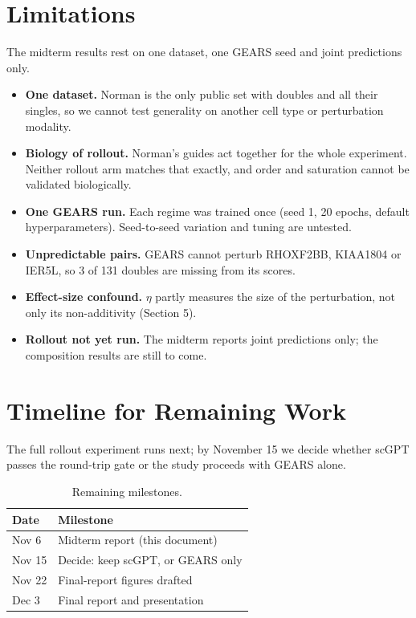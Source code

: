 \documentclass[11pt]{article}
\begin{document}
\section{Limitations}

The midterm results rest on one dataset, one GEARS seed and joint predictions only.
\begin{itemize}
  \item \textbf{One dataset.} Norman is the only public set with doubles and all their
  singles, so we cannot test generality on another cell type or perturbation modality.
  \item \textbf{Biology of rollout.} Norman's guides act together for the whole experiment.
  Neither rollout arm matches that exactly, and order and saturation cannot be validated
  biologically.
  \item \textbf{One GEARS run.} Each regime was trained once (seed 1, 20 epochs, default
  hyperparameters). Seed-to-seed variation and tuning are untested.
  \item \textbf{Unpredictable pairs.} GEARS cannot perturb RHOXF2BB, KIAA1804 or IER5L, so 3
  of 131 doubles are missing from its scores.
  \item \textbf{Effect-size confound.} $\eta$ partly measures the size of the perturbation,
  not only its non-additivity (Section 5).
  \item \textbf{Rollout not yet run.} The midterm reports joint predictions only; the
  composition results are still to come.
\end{itemize}

\section{Timeline for Remaining Work}

The full rollout experiment runs next; by November 15 we decide whether scGPT passes the
round-trip gate or the study proceeds with GEARS alone.

\begin{table}[h]
\centering
\caption{Remaining milestones.}
\begin{tabular}{ll}
\toprule
Date & Milestone \\
\midrule
Nov 6 & Midterm report (this document) \\
Nov 15 & Decide: keep scGPT, or GEARS only \\
Nov 22 & Final-report figures drafted \\
Dec 3 & Final report and presentation \\
\bottomrule
\end{tabular}
\end{table}
\end{document}

